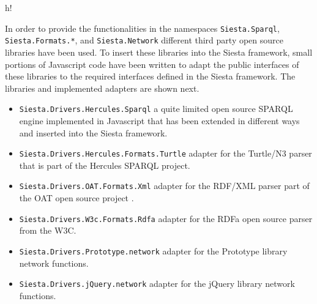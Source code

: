 \begin{table}{h!}
\noindent{}
\caption{Components in the foundation layer of the Siesta Framework}
\end{table}

In order to provide the functionalities in the namespaces \texttt{Siesta.Sparql}, \texttt{Siesta.Formats.*}, and
\texttt{Siesta.Network} different third party open source libraries have been used. To insert these libraries into the
Siesta framework, small portions of Javascript code have been written to adapt the public interfaces of these libraries to
the required interfaces defined in the Siesta framework. The libraries and implemented adapters are shown next.

\begin{itemize}
\item \texttt{Siesta.Drivers.Hercules.Sparql} a quite limited open source SPARQL engine implemented in Javascript that has been extended in different ways and inserted into
  the Siesta framework.
\item \texttt{Siesta.Drivers.Hercules.Formats.Turtle} adapter for the Turtle/N3 parser that is part of the Hercules SPARQL project.
\item \texttt{Siesta.Drivers.OAT.Formats.Xml} adapter for the RDF/XML parser part of the OAT open source project .
\item \texttt{Siesta.Drivers.W3c.Formats.Rdfa} adapter for the RDFa open source parser from the W3C.
\item \texttt{Siesta.Drivers.Prototype.network} adapter for the Prototype library network functions.
\item \texttt{Siesta.Drivers.jQuery.network} adapter for the jQuery library network functions.
\end{itemize}

